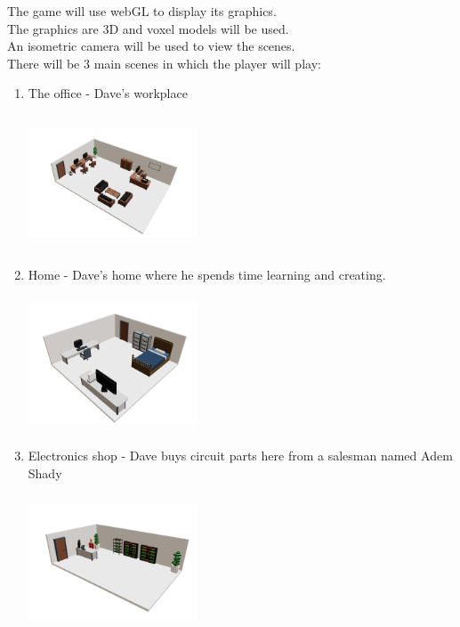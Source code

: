 \documentclass[12pt]{article}
\begin{document}
The game will use webGL to display its graphics.\\
The graphics are 3D and voxel models will be used.\\
An isometric camera will be used to view the scenes.\\
There will be 3 main scenes in which the player will play:\\
\begin{enumerate}
    \item The office - Dave's workplace
          \begin{center}
              \includegraphics[width=5cm, height=4cm]{office.png}
          \end{center}
          \pagebreak
    \item Home - Dave's home where he spends time learning and creating.
          \begin{center}
              \includegraphics[width=5cm, height=4cm]{home.png}
          \end{center}
    \item Electronics shop - Dave buys circuit parts here from a salesman named Adem Shady
          \begin{center}
              \includegraphics[width=5cm, height=4cm]{shop.jpeg}
          \end{center}
\end{enumerate}
\end{document}
